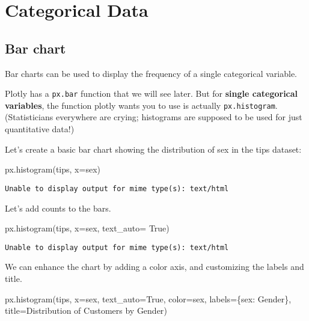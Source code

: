 \documentclass[
  letterpaper,
  DIV=11,
  numbers=noendperiod]{scrreprt}
\newenvironment{Shaded}{\begin{snugshade}}{\end{snugshade}}
\newcommand{\NormalTok}[1]{\textcolor[rgb]{0.00,0.23,0.31}{#1}}
\newcommand{\OperatorTok}[1]{\textcolor[rgb]{0.37,0.37,0.37}{#1}}
\newcommand{\StringTok}[1]{\textcolor[rgb]{0.13,0.47,0.30}{#1}}
\newcommand{\VariableTok}[1]{\textcolor[rgb]{0.07,0.07,0.07}{#1}}
\begin{document}
\section{Categorical Data}\label{categorical-data}

\subsection{Bar chart}\label{bar-chart}

Bar charts can be used to display the frequency of a single categorical
variable.

Plotly has a \texttt{px.bar} function that we will see later. But for
\textbf{single categorical variables}, the function plotly wants you to
use is actually \texttt{px.histogram}. (Statisticians everywhere are
crying; histograms are supposed to be used for just quantitative data!)

Let's create a basic bar chart showing the distribution of sex in the
tips dataset:

\begin{Shaded}
\begin{Highlighting}[]
\NormalTok{px.histogram(tips, x}\OperatorTok{=}\StringTok{\textquotesingle{}sex\textquotesingle{}}\NormalTok{)   }
\end{Highlighting}
\end{Shaded}

\begin{verbatim}
Unable to display output for mime type(s): text/html
\end{verbatim}

Let's add counts to the bars.

\begin{Shaded}
\begin{Highlighting}[]
\NormalTok{px.histogram(tips, x}\OperatorTok{=}\StringTok{\textquotesingle{}sex\textquotesingle{}}\NormalTok{, text\_auto}\OperatorTok{=} \VariableTok{True}\NormalTok{)}
\end{Highlighting}
\end{Shaded}

\begin{verbatim}
Unable to display output for mime type(s): text/html
\end{verbatim}

We can enhance the chart by adding a color axis, and customizing the
labels and title.

\begin{Shaded}
\begin{Highlighting}[]
\NormalTok{px.histogram(tips, x}\OperatorTok{=}\StringTok{\textquotesingle{}sex\textquotesingle{}}\NormalTok{, text\_auto}\OperatorTok{=}\VariableTok{True}\NormalTok{, color}\OperatorTok{=}\StringTok{\textquotesingle{}sex\textquotesingle{}}\NormalTok{, }
\NormalTok{             labels}\OperatorTok{=}\NormalTok{\{}\StringTok{\textquotesingle{}sex\textquotesingle{}}\NormalTok{: }\StringTok{\textquotesingle{}Gender\textquotesingle{}}\NormalTok{\},}
\NormalTok{             title}\OperatorTok{=}\StringTok{\textquotesingle{}Distribution of Customers by Gender\textquotesingle{}}\NormalTok{)}
\end{Highlighting}
\end{Shaded}
\end{document}
